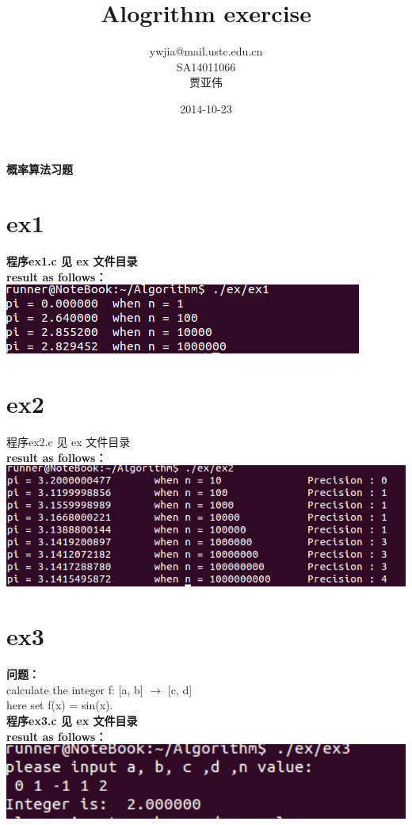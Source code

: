 \documentclass[10pt, a4paper]{article}
\title{\textbf{Alogrithm exercise }}
\author{ywjia@mail.ustc.edu.cn\\
		SA14011066\\
		贾亚伟}
\date{2014-10-23}
\begin{document}
\maketitle
{}

\begin{center} 
\textbf{概率算法习题}
\end{center}
\section{ex1}
\textbf{程序ex1.c 见 ex 文件目录 }\\
\textbf{result as follows：} \\

\includegraphics{../pic/ex1pic.png}

\section{ex2}
程序ex2.c 见 ex 文件目录  \\
\textbf{result as follows：} \\

\includegraphics[width=15cm]{../pic/ex2.png}

\section{ex3}
\textbf{问题：}\\
 calculate the integer f: [a, b] $\rightarrow$ [c, d] \\
 here set f(x) = sin(x).\\
\textbf{程序ex3.c 见 ex 文件目录 } \\
\textbf{result as follows：} \\

\includegraphics[width=15cm]{../pic/ex3.png}
\end{document}
